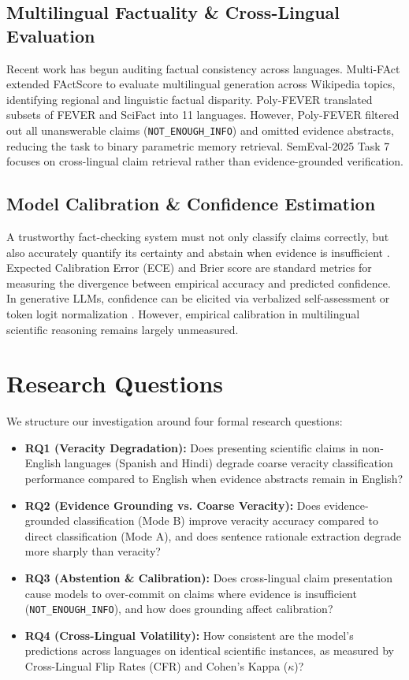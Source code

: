 \documentclass[10pt,twocolumn]{article}
\begin{document}
\subsection{Multilingual Factuality & Cross-Lingual Evaluation}
Recent work has begun auditing factual consistency across languages. Multi-FAct \cite{shafayat2024multifact} extended FActScore \cite{min2023factscore} to evaluate multilingual generation across Wikipedia topics, identifying regional and linguistic factual disparity. Poly-FEVER \cite{zhang2024polyfever} translated subsets of FEVER and SciFact into 11 languages. However, Poly-FEVER filtered out all unanswerable claims (\texttt{NOT\_ENOUGH_INFO}) and omitted evidence abstracts, reducing the task to binary parametric memory retrieval. SemEval-2025 Task 7 focuses on cross-lingual claim retrieval rather than evidence-grounded verification. 

\subsection{Model Calibration & Confidence Estimation}
A trustworthy fact-checking system must not only classify claims correctly, but also accurately quantify its certainty and abstain when evidence is insufficient \cite{guo2017calibration}. Expected Calibration Error (ECE) and Brier score \cite{brier1950verification} are standard metrics for measuring the divergence between empirical accuracy and predicted confidence. In generative LLMs, confidence can be elicited via verbalized self-assessment or token logit normalization \cite{yang2024qwen25}. However, empirical calibration in multilingual scientific reasoning remains largely unmeasured.

\section{Research Questions}
\label{sec:rqs}

We structure our investigation around four formal research questions:
\begin{itemize}
    \item \textbf{RQ1 (Veracity Degradation):} Does presenting scientific claims in non-English languages (Spanish and Hindi) degrade coarse veracity classification performance compared to English when evidence abstracts remain in English?
    \item \textbf{RQ2 (Evidence Grounding vs. Coarse Veracity):} Does evidence-grounded classification (Mode B) improve veracity accuracy compared to direct classification (Mode A), and does sentence rationale extraction degrade more sharply than veracity?
    \item \textbf{RQ3 (Abstention & Calibration):} Does cross-lingual claim presentation cause models to over-commit on claims where evidence is insufficient (\texttt{NOT\_ENOUGH_INFO}), and how does grounding affect calibration?
    \item \textbf{RQ4 (Cross-Lingual Volatility):} How consistent are the model's predictions across languages on identical scientific instances, as measured by Cross-Lingual Flip Rates (CFR) and Cohen's Kappa ($\kappa$)?
\end{itemize}
\end{document}
